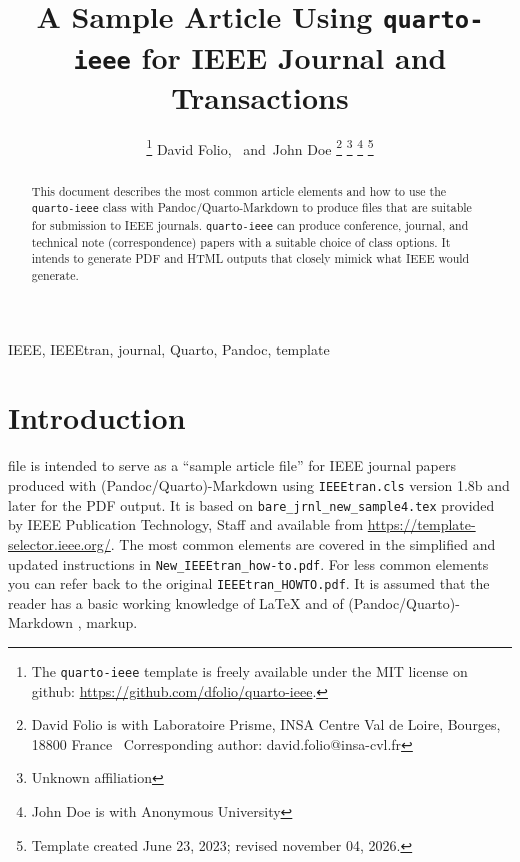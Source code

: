 \documentclass[
  twoside,
  web,
            journal,
    ]{ieeecolor}
\title{A Sample Article Using \texttt{quarto-ieee} for IEEE Journal and
Transactions}
\author{
\thanks{The \texttt{quarto-ieee} template is freely available under the
MIT license on github: \url{https://github.com/dfolio/quarto-ieee}.}
David Folio\orcidlink{0000-0001-9430-6091},~\IEEEmembership{Member,
IEEE}
and~John Doe%
\thanks{David Folio is with Laboratoire Prisme, INSA Centre Val de
Loire, Bourges, 18800 France%
  Corresponding author: david.folio@insa-cvl.fr
}
\thanks{Unknown affiliation}
\thanks{John Doe is with Anonymous University%
}
\thanks{Template created June 23, 2023; revised november 04, 2026.}
}
\theoremstyle{plain}
\theoremstyle{remark}
\begin{document}


\maketitle

\begin{abstract}
This document describes the most common article elements and how to use
the \texttt{quarto-ieee} class with Pandoc/Quarto-Markdown to produce
files that are suitable for submission to IEEE journals.
\texttt{quarto-ieee} can produce conference, journal, and technical note
(correspondence) papers with a suitable choice of class options. It
intends to generate PDF and HTML outputs that closely mimick what IEEE
would generate.
\end{abstract}
\begin{IEEEkeywords}
IEEE, IEEEtran, journal, Quarto, Pandoc, template
\end{IEEEkeywords}

%


\section{Introduction}\label{sec-intro}

 file is intended to serve as a ``sample article
file'' for IEEE journal papers produced with (Pandoc/Quarto)-Markdown
using \texttt{IEEEtran.cls} version 1.8b and later for the PDF output.
It is based on \texttt{bare\_jrnl\_new\_sample4.tex} provided by IEEE
Publication Technology, Staff and available from
\url{https://template-selector.ieee.org/}. The most common elements are
covered in the simplified and updated instructions in
\texttt{New\_IEEEtran\_how-to.pdf}. For less common elements you can
refer back to the original \texttt{IEEEtran\_HOWTO.pdf}. It is assumed
that the reader has a basic working knowledge of {\LaTeX}
 and of
(Pandoc/Quarto)-Markdown ,
 markup.
\end{document}
